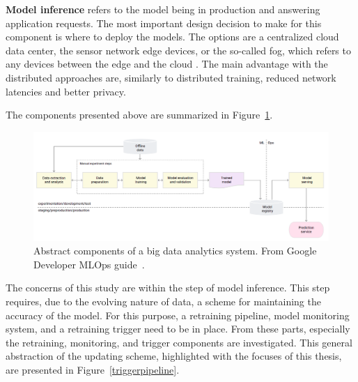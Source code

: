 \textbf{Model inference} refers to the model being in production and answering application requests.
The most important design decision to make for this component is where to deploy the models. The options are a centralized cloud data center, the sensor network edge devices, or the so-called fog, which refers to any devices between the edge and the cloud \cite{fogsurvey}. The main advantage with the distributed approaches are, similarly to distributed training, reduced network latencies and better privacy. \cite{szeEfficientProcessingDeep2017}

The components presented above are summarized in Figure~\ref{simplepipeline}.

\begin{figure}[hb]
\newline
\begin{center}
\includegraphics[width=1.0\columnwidth]{simplegoogle.png}
\caption{Abstract components of a big data analytics system. From Google Developer MLOps guide~\cite{googlemlops}.}
\label{simplepipeline}
\end{center}
\end{figure}

The concerns of this study are within the step of model inference. This step requires, due to the evolving nature of data, a scheme for maintaining the accuracy of the model. For this purpose, a retraining pipeline, model monitoring system, and a retraining trigger need to be in place. From these parts, especially the retraining, monitoring, and trigger components are investigated. This general abstraction of the updating scheme, highlighted with the focuses of this thesis, are presented in Figure~\ref{triggerpipeline}.

